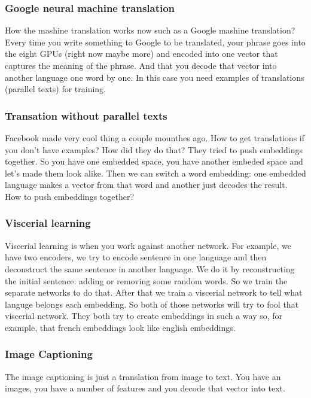 \subsubsection*{Google neural machine translation}

How the mashine translation works now such as a Google mashine translation? Every time you write something to Google to be translated, your phrase goes into the eight GPUs (right now maybe more) and encoded into one vector that captures the meaning of the phrase. And that you decode that vector into another language one word by one. In this case you need examples of translations (parallel texts) for training.

\subsubsection*{Transation without parallel texts}

Facebook made very cool thing a couple mounthes ago. How to get translations if you don't have examples? How did they do that? They tried to push embeddings together. So you have one embedded space, you have another embeded space and let's made them look alike. Then we can switch a word embedding: one embedded language makes a vector from that word and another just decodes the result. How to push embeddings together?

\subsubsection*{Viscerial learning}

Viscerial learning is when you work against another network. For example, we have two encoders, we try to encode sentence in one language and then deconstruct the same sentence in another language. We do it by reconstructing the initial sentence: adding or removing some random words. So we train the separate networks to do that. After that we train a viscerial network to tell what languge belongs each embedding. So both of those networks will try to fool that viscerial network. They both try to create embeddings in such a way so, for example, that french embeddings look like english embeddings.

\subsubsection*{Image Captioning}

The image captioning is just a translation from image to text. You have an images, you have a number of features and you decode that vector into text.